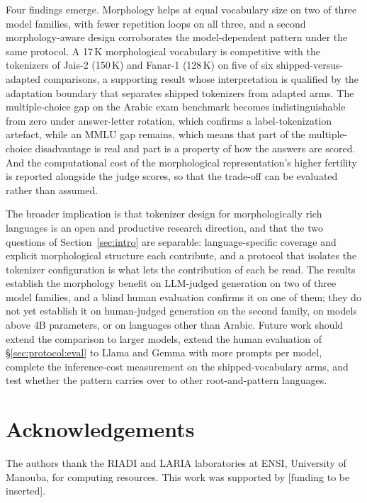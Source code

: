 \documentclass[a4paper,fleqn]{cas-sc}
\begin{document}
Four findings emerge. Morphology helps at equal vocabulary size on two of three model families, with fewer repetition loops on all three, and a second morphology-aware design corroborates the model-dependent pattern under the same protocol. A 17\,K morphological vocabulary is competitive with the tokenizers of Jais-2 (150\,K) and Fanar-1 (128\,K) on five of six shipped-versus-adapted comparisons, a supporting result whose interpretation is qualified by the adaptation boundary that separates shipped tokenizers from adapted arms. The multiple-choice gap on the Arabic exam benchmark becomes indistinguishable from zero under answer-letter rotation, which confirms a label-tokenization artefact, while an MMLU gap remains, which means that part of the multiple-choice disadvantage is real and part is a property of how the answers are scored. And the computational cost of the morphological representation's higher fertility is reported alongside the judge scores, so that the trade-off can be evaluated rather than assumed.

The broader implication is that tokenizer design for morphologically rich languages is an open and productive research direction, and that the two questions of Section~\ref{sec:intro} are separable: language-specific coverage and explicit morphological structure each contribute, and a protocol that isolates the tokenizer configuration is what lets the contribution of each be read. The results establish the morphology benefit on LLM-judged generation on two of three model families, and a blind human evaluation confirms it on one of them; they do not yet establish it on human-judged generation on the second family, on models above 4B parameters, or on languages other than Arabic. Future work should extend the comparison to larger models, extend the human evaluation of \S\ref{sec:protocol:eval} to Llama and Gemma with more prompts per model, complete the inference-cost measurement on the shipped-vocabulary arms, and test whether the pattern carries over to other root-and-pattern languages.

\section*{Acknowledgements}

The authors thank the RIADI and LARIA laboratories at ENSI, University of Manouba, for computing resources. This work was supported by [funding to be inserted].

\printcredits



\end{document}
